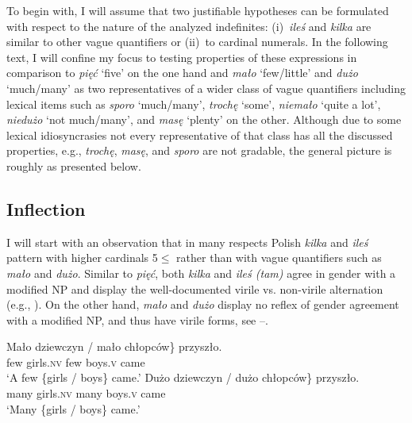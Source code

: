\documentclass[output=paper,
]{langscibook}
\begin{document}
	To begin with, I will assume that two justifiable hypotheses can be formulated with respect to the nature of the analyzed indefinites: (i)~\textit{ileś} and \textit{kilka} are similar to other vague quantifiers or (ii)~to cardinal numerals. In the following text, I will confine my focus to testing properties of these expressions in comparison to \textit{pięć} `five' on the one hand and \textit{mało} `few/little' and \textit{dużo} `much/many' as two representatives of a wider class of vague quantifiers including lexical items such as \textit{sporo} `much/many', \textit{trochę} `some', \textit{niemało} `quite a lot', \textit{niedużo} `not much/many', and \textit{masę} `plenty' on the other.	Although due to some lexical idiosyncrasies not every representative of that class has all the discussed properties, e.g., \textit{trochę}, \textit{masę}, and \textit{sporo} are not gradable, the general picture is roughly as presented below.
	
	\subsection{Inflection}\label{sec:inflection}
	
	I will start with an observation that in many respects Polish \textit{kilka} and \textit{ileś} pattern with higher cardinals 5$\leq$ rather than with vague quantifiers such as \textit{mało} and \textit{dużo}. Similar to \textit{pięć}, both \textit{kilka} and \textit{ileś (tam)} agree in gender with a modified NP and display the well-documented virile vs. non-virile alternation (e.g., \citealt{miechowicz-mathiasen2011syntax}). On the other hand, \textit{mało} and \textit{dużo} display no reflex of gender agreement with a modified NP, and thus have virile forms, see --.
	
	\ea \label{ex:gender-agreement-quantifiers} \ea \gll \minsp{\{} Mało dziewczyn / mało chłopców\} przyszło.\\
	{} few girls.\textsc{nv} {} few boys.\textsc{v} came\\
	\glt `A few \{girls / boys\} came.'
	\ex \gll \minsp{\{} Dużo dziewczyn / dużo chłopców\} przyszło.\\
	{} many girls.\textsc{nv} {} many boys.\textsc{v} came\\
	\glt `Many \{girls / boys\} came.'
    \z
    \z
\end{document}
